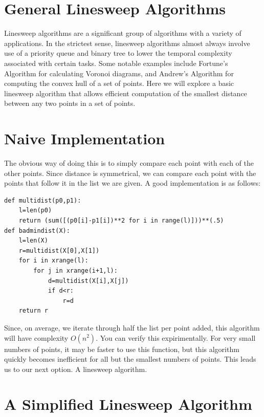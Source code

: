 

\section*{General Linesweep Algorithms}

Linesweep algorithms are a significant group of algorithms with a variety of applications. 
In the strictest sense, linesweep algorithms almost always involve use of a priority queue and binary tree to lower the temporal complexity associated with certain tasks. 
Some notable examples include Fortune's Algorithm for calculating Voronoi diagrams, and Andrew's Algorithm for computing the convex hull of a set of points. 
Here we will explore a basic linesweep algorithm that allows efficient computation of the smallest distance between any two points in a set of points. 

\section*{Naive Implementation}

The obvious way of doing this is to simply compare each point with each of the other points. 
Since distance is symmetrical, we can compare each point with the points that follow it in the list we are given. 
A good implementation is as follows:

\begin{lstlisting}
def multidist(p0,p1):
    l=len(p0)
    return (sum([(p0[i]-p1[i])**2 for i in range(l)]))**(.5)
def badmindist(X):
    l=len(X)
    r=multidist(X[0],X[1])
    for i in xrange(l):
        for j in xrange(i+1,l):
            d=multidist(X[i],X[j])
            if d<r:
                r=d
    return r
\end{lstlisting}

Since, on average, we iterate through half the list per point added, this algorithm will have complexity $O(n^2)$. 
You can verify this expirimentally. 
For very small numbers of points, it may be faster to use this function, but this algorithm quickly becomes inefficient for all but the smallest numbers of points. 
This leads us to our next option. 
A linesweep algorithm.

\section*{A Simplified Linesweep Algorithm}

